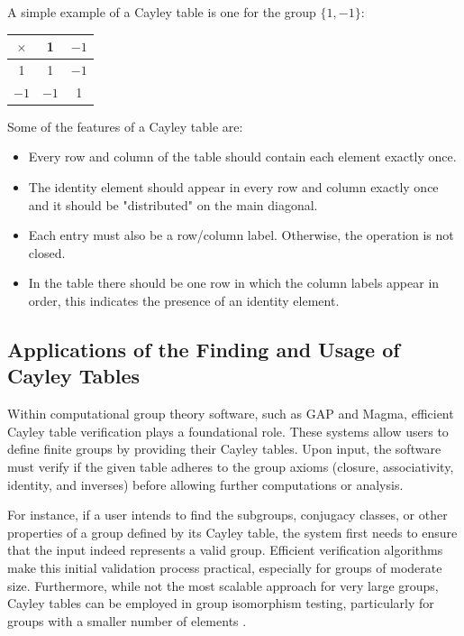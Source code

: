 \documentclass[sigconf]{acmart}
\begin{document}
A simple example of a Cayley table is one for the group \(\{1,-1 \}\):
\begin{center}
\begin{tabular}{|c|c|c|}
\hline
$\times$ & 1 & $-1$ \\
\hline
1   & 1   & $-1$ \\
\hline
$-1$ & $-1$ & 1   \\
\hline
\end{tabular}
\end{center}

Some of the features of a Cayley table are:
\begin{itemize}
    \item Every row and column of the table should contain each element exactly once.
    \item The identity element should appear in every row and column exactly once and it should be "distributed" on the main diagonal.
    \item Each entry must also be a row/column label. Otherwise, the operation is not closed.
    \item In the table there should be one row in which the column labels appear in order, this indicates the presence of an identity element.
\end{itemize}

\subsection{Applications of the Finding and Usage of Cayley Tables}

Within computational group theory software, such as GAP and Magma, efficient Cayley table verification plays a foundational role.
These systems allow users to define finite groups by providing their Cayley tables.
Upon input, the software must verify if the given table adheres to the group axioms (closure, associativity, identity, and inverses)
before allowing further computations or analysis. 

For instance, if a user intends to find the subgroups, conjugacy classes, or
other properties of a group defined by its Cayley table, the system first needs to ensure that the input indeed represents a valid group. 
Efficient verification algorithms make this initial validation process practical, especially for groups of moderate size. 
Furthermore, while not the most scalable approach for very large groups, Cayley tables can be employed in group isomorphism 
testing, particularly for groups with a smaller number of elements \cite{williams2015group}.
\end{document}

